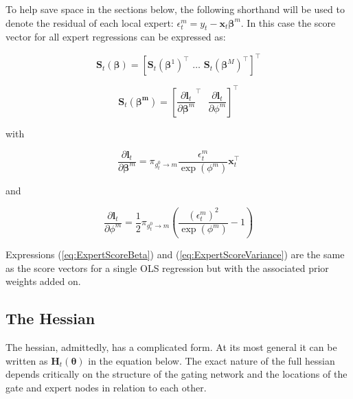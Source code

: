 \documentclass[12pt]{article}
\newcommand{\Ht}[1]{\mathbf{H}_{t}(#1)}
\newcommand{\gateprod}[2]{\pi_{#1 \longrightarrow #2}}
\begin{document}
To help save space in the sections below, the following shorthand will be used 
to denote the residual of each local expert: $\epsilon^{m}_{t} = y_{t} - \boldsymbol{x}_{t} \boldsymbol{\beta}^{m}$.
In this case the score vector for all expert regressions can be expressed as:

\begin{equation}
  \boldsymbol{S}_{t}(\boldsymbol{\beta}) = [ \boldsymbol{S}_{t}(\boldsymbol{\beta}^{1})^{\top} \,\, \ldots \,\, \boldsymbol{S}_{t}(\boldsymbol{\beta}^{M})^{\top} ]^{\top}
\end{equation}

\begin{equation} \label{eq:expertScore}
  \boldsymbol{S}_{t}(\boldsymbol{\beta^{m}}) = \left[ \frac{\partial \boldsymbol{l}_{t}}{\partial \boldsymbol{\beta}^{m}}^{\top} \,\,\,\, \frac{\partial \boldsymbol{l}_{t}}{\partial \phi^{m}} \right]^{\top}
\end{equation}

with

\begin{equation} \label{eq:ExpertScoreBeta}
  \frac{\partial \boldsymbol{l}_{t}}{\partial \boldsymbol{\beta}^{m}} = \gateprod{g^{0}_{t}}{m} \frac{ \epsilon^{m}_{t} }{\exp{(\phi^{m})}} \boldsymbol{x}_{t}^{\top}
\end{equation}
 
and

\begin{equation} \label{eq:ExpertScoreVariance}
  \frac{\partial \boldsymbol{l}_{t}}{\partial \phi^{m}} = \frac{1}{2} \gateprod{g^{0}_{t}}{m} \left( \frac{( \epsilon^{m}_{t} )^{2}}{\exp{(\phi^{m})}} - 1 \right)
\end{equation}

Expressions (\ref{eq:ExpertScoreBeta}) and (\ref{eq:ExpertScoreVariance})
are the same as the score vectors for a single OLS regression but with
the associated prior weights added on.


\subsection{The Hessian} \label{sec:TheHessian}

The hessian, admittedly, has a complicated form. At its most general it
can be written as $\Ht{\boldsymbol{\theta}}$ in the equation below. The
exact nature of the full hessian depends critically on the structure of the
gating network and the locations of the gate and expert nodes in relation to 
each other.
\end{document}
